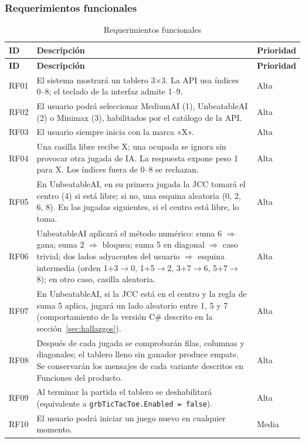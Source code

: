 \documentclass[12pt,a4paper]{article}
\begin{document}
\subsubsection{Requerimientos funcionales}
\begin{longtable}{p{1.3cm}p{9.2cm}p{2.6cm}}
\caption{Requerimientos funcionales}\\
\toprule
\textbf{ID} & \textbf{Descripción} & \textbf{Prioridad}\\
\midrule\endfirsthead
\toprule
\textbf{ID} & \textbf{Descripción} & \textbf{Prioridad}\\
\midrule\endhead
RF01 & El sistema mostrará un tablero 3$\times$3. La API usa índices 0--8; el teclado de la interfaz admite 1--9. & Alta\\
RF02 & El usuario podrá seleccionar MediumAI (1), UnbeatableAI (2) o Minimax (3), habilitados por el catálogo de la API. & Alta\\
RF03 & El usuario siempre inicia con la marca «X». & Alta\\
RF04 & Una casilla libre recibe X; una ocupada se ignora sin provocar otra jugada de IA. La respuesta expone peso 1 para X. Los índices fuera de 0--8 se rechazan. & Alta\\
RF05 & En UnbeatableAI, en su primera jugada la JCC tomará el centro (4) si está libre; si no, una esquina aleatoria (0, 2, 6, 8). En las jugadas siguientes, si el centro está libre, lo toma. & Alta\\
RF06 & UnbeatableAI aplicará el método numérico: suma 6 $\Rightarrow$ gana; suma 2 $\Rightarrow$ bloquea; suma 5 en diagonal $\Rightarrow$ caso trivial; dos lados adyacentes del usuario $\Rightarrow$ esquina intermedia (orden 1+3$\to$0, 1+5$\to$2, 3+7$\to$6, 5+7$\to$8); en otro caso, casilla aleatoria. & Alta\\
RF07 & En UnbeatableAI, si la JCC está en el centro y la regla de suma 5 aplica, jugará un lado aleatorio entre 1, 5 y 7 (comportamiento de la versión C\# descrito en la sección~\ref{sec:hallazgos}). & Alta\\
RF08 & Después de cada jugada se comprobarán filas, columnas y diagonales; el tablero lleno sin ganador produce empate. Se conservarán los mensajes de cada variante descritos en Funciones del producto. & Alta\\
RF09 & Al terminar la partida el tablero se deshabilitará (equivalente a \texttt{grbTicTacToe.Enabled = false}). & Alta\\
RF10 & El usuario podrá iniciar un juego nuevo en cualquier momento. & Media\\

\end{longtable}
\end{document}
